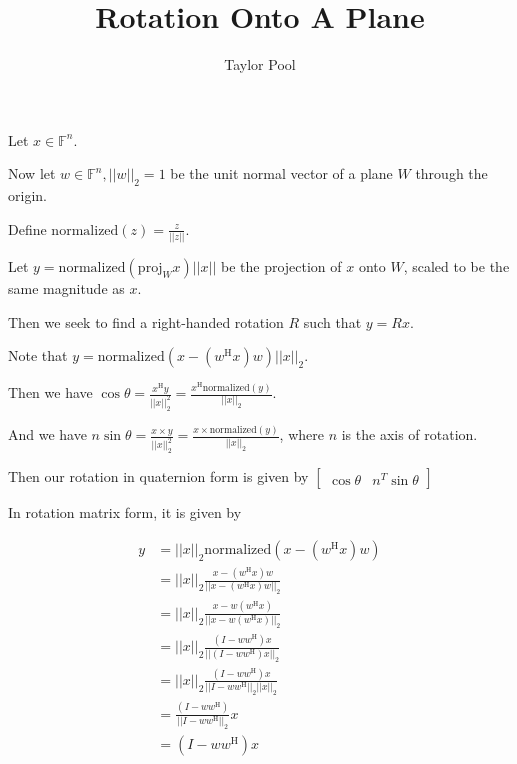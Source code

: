 \documentclass{article}
\title{Rotation Onto A Plane}
\author{Taylor Pool}
\begin{document}
\maketitle

Let $x \in \mathbb{F}^n$.

Now let $w \in \mathbb{F}^n, || w ||_2 = 1$ be the unit normal vector of a plane $W$ through the origin.

Define $\mathrm{normalized}(z) = \frac{z}{||z||}$.

Let $y = \mathrm{normalized}(\mathrm{proj}_W x) || x ||$ be the projection of $x$ onto $W$, scaled to be the same magnitude as $x$.

Then we seek to find a right-handed rotation $R$ such that $y = Rx$.

Note that $y = \mathrm{normalized}(x - (w^\mathrm{H} x) w) || x ||_2$.

Then we have $\cos{\theta} = \frac{x^\mathrm{H} y}{|| x ||^2_2} = \frac{x^\mathrm{H} \mathrm{normalized}(y)}{ || x ||_2 }$.

And we have $n \sin{\theta} = \frac{x \times y}{|| x ||^2_2} = \frac{x \times \mathrm{normalized}(y)}{ || x ||_2 }$, where $n$ is the axis of rotation.

Then our rotation in quaternion form is given by $\begin{bmatrix} \cos{\theta} & n^T \sin{\theta} \end{bmatrix}$

In rotation matrix form, it is given by

\begin{align*}
	y & = || x ||_2 \mathrm{normalized}( x - (w^\mathrm{H} x) w)                              \\
	  & = || x ||_2 \frac{ x - (w^\mathrm{H} x) w}{ || x - (w^\mathrm{H} x) w ||_2}           \\
	  & = || x ||_2 \frac{ x - w (w^\mathrm{H} x)  }{ || x - w (w^\mathrm{H} x) ||_2}         \\
	  & = || x ||_2 \frac{ ( I - w w^\mathrm{H} ) x }{ || (I - w w^\mathrm{H} ) x ||_2 }      \\
	  & = || x ||_2 \frac{ ( I - w w^\mathrm{H} ) x }{ || I - w w^\mathrm{H} ||_2 || x ||_2 } \\
	  & = \frac{ ( I - w w^\mathrm{H} ) }{ || I - w w^\mathrm{H} ||_2 } x                     \\
	  & = ( I - w w^\mathrm{H} ) x
\end{align*}
\end{document}
